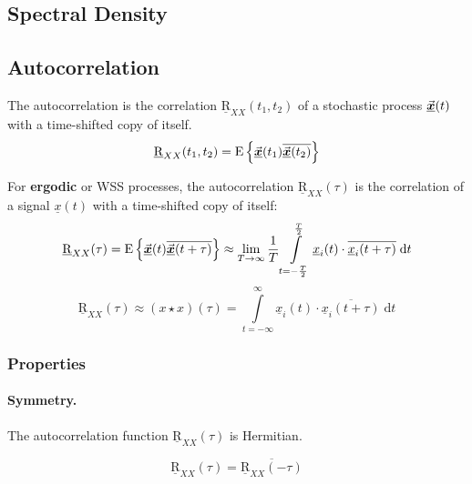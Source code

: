 \begin{refsection}
\section{Spectral Density}

\subsection{Autocorrelation}

The autocorrelation is the correlation $\underline{\mathrm{R}}_{XX}(t_1, t_2)$ of a stochastic process $\vec{\bm{\underline{x}}}(t)$ with a time-shifted copy of itself.
\begin{equation}
	\underline{\mathrm{R}}_{XX}(t_1, t_2) = \mathrm{E}\left\{ \vec{\bm{\underline{x}}}(t_1) \overline{\vec{\bm{\underline{x}}}(t_2)} \right\}
\end{equation}

For \textbf{ergodic} or \ac{WSS} processes, the autocorrelation $\underline{\mathrm{R}}_{XX}(\tau)$ is the correlation of a signal $\underline{x}(t)$ with a time-shifted copy of itself:
\begin{equation}
	\underline{\mathrm{R}}_{XX}(\tau) = \mathrm{E}\left\{ \vec{\bm{\underline{x}}}(t) \overline{\vec{\bm{\underline{x}}}(t+\tau)} \right\} \approx \lim\limits_{T \rightarrow \infty} \frac{1}{T} \int\limits_{t = -\frac{T}{2}}^{\frac{T}{2}} \underline{x}_i(t) \cdot \overline{\underline{x}_i(t+\tau)} \; \mathrm{d} t
\end{equation}
\begin{equation}
	\underline{\mathrm{R}}_{XX}(\tau) \approx \left(x \star x\right)(\tau) = \int\limits_{t = -\infty}^{\infty} \underline{x}_i(t) \cdot \overline{\underline{x}_i(t+\tau)} \; \mathrm{d} t
\end{equation}

\subsubsection{Properties}

\paragraph{Symmetry.}

The autocorrelation function $\underline{\mathrm{R}}_{XX}(\tau)$ is Hermitian.

\begin{equation}
	\underline{\mathrm{R}}_{XX}(\tau) = \overline{\underline{\mathrm{R}}_{XX}(-\tau)}
	\label{eq:ch02:autocorr_hermitian}
\end{equation}


\end{refsection}
